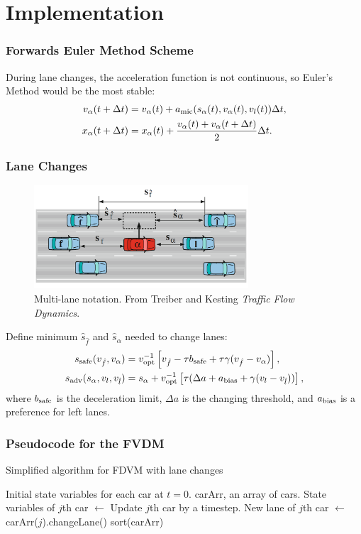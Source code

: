 \documentclass{beamer}
\begin{document}
\section{Implementation}
\begin{frame}
  \frametitle{Forwards Euler Method Scheme}
  During lane changes, the acceleration function is not continuous, so Euler's Method would be the most stable:
  \begin{align*}
    v_\alpha(t+\Delta t) &= v_\alpha(t) +a_{\rm mic}(s_\alpha(t), v_\alpha (t), v_l (t))\Delta t, \\
    x_\alpha(t + \Delta t) &= x_\alpha(t) + \frac{v_\alpha (t) + v_\alpha (t+\Delta t)}{2}\Delta t.
\end{align*}
\end{frame}

\begin{frame}
  \frametitle{Lane Changes}
  \begin{figure}[H]
    \includegraphics[width=8cm]{lane_change_diagram.PNG}
    \centering
    \caption{Multi-lane notation. From Treiber and Kesting \textit{Traffic Flow Dynamics}.}
\end{figure}
  Define minimum $\hat s_{\hat f}$ and $\hat s_{\alpha}$ needed to change lanes: 
  \begin{align*}
    s_{\rm safe} (v_{\hat f}, v_{\alpha}) &= v_{\rm opt}^{-1} \left[v_{\hat f} -\tau b_{\rm safe} + \tau \gamma (v_{\hat f} - v_{\alpha}) \right],\\
    s_{\rm adv}(s_\alpha, v_l, v_{\hat l}) &= s_{\alpha} + v_{\rm opt}^{-1} \left[\tau(\Delta a + a_{\rm bias} + \gamma(v_l - v_{\hat l}))\right],
  \end{align*}
  where $b_{\rm safe}$ is the  deceleration limit, $\Delta a$ is the changing threshold, and $a_{\rm bias}$ is a preference for left lanes. 
\end{frame}

\begin{frame}
  \frametitle{Pseudocode for the FVDM}
  \begin{algorithm}
    \caption{Simplified algorithm for FDVM with lane changes}\label{alg:car-following-lane}
    \begin{algorithmic}
    \Require Initial state variables for each car at $t=0$. 
    \Require carArr, an array of cars.
      \State State variables of $j$th car $\gets$ Update $j$th car by a timestep.
      \State New lane of $j$th car $\gets$ carArr($j$).changeLane()
      \EndFor
      \State sort(carArr)
    \EndFor
    \end{algorithmic}
    \end{algorithm}
\end{frame}
\end{document}
